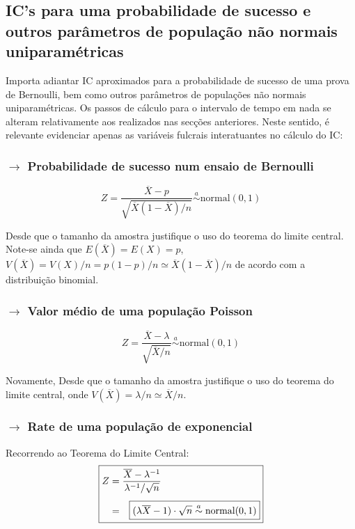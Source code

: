 \newpage
\subsection[5.4 IC's para uma probabilidade de sucesso e outros parâmetros de população não normais uniparamétricas]{\hspace*{0.075 em}\raisebox{0.2 em}{$\pmb{\drsh}$} IC's para uma probabilidade de sucesso e outros parâmetros de população não normais uniparamétricas}

\noindent Importa adiantar IC aproximados para a probabilidade de sucesso de uma prova de Bernoulli, bem como outros parâmetros de populações não normais uniparamétricas. Os passos de cálculo para o intervalo de tempo em nada se alteram relativamente aos realizados nas secções anteriores. Neste sentido, é relevante evidenciar apenas as variáveis fulcrais interatuantes no cálculo do IC:

\subsubsection[5.4.1 Probabilidade de sucesso num ensaio de Bernoulli]{$\pmb{\rightarrow}$ Probabilidade de sucesso num ensaio de Bernoulli}

$$
    \boxed{Z = \dfrac{\overline{X} - p}{\sqrt{\overline{X}(1-\overline{X})/n}} \overset{a}{\sim} \text{normal}(0,1)}
$$

\noindent Desde que o tamanho da amostra justifique o uso do teorema do limite central. Note-se ainda que $E(\overline{X}) = E(X) = p$, $V(\overline{X}) = V(X)/n = p(1 - p)/n \simeq \overline{X}(1-\overline{X})/n$ de acordo com a distribuição binomial.

\subsubsection[5.4.2 Valor médio de uma população Poisson]{$\pmb{\rightarrow}$ Valor médio de uma população Poisson}

$$
    \boxed{Z = \dfrac{\overline{X} - \lambda}{\sqrt{\overline{X}/n}} \overset{a}{\sim} \text{normal}(0,1)}
$$

\noindent Novamente, Desde que o tamanho da amostra justifique o uso do teorema do limite central, onde $V(\overline{X}) = \lambda/n \simeq \overline{X}/n$.

\subsubsection[5.4.3 Rate de uma população exponencial]{$\pmb{\rightarrow}$ Rate de uma população de exponencial}

\noindent Recorrendo ao Teorema do Limite Central:
$$
    \boxed{%
    \begin{aligned}
        Z &= \dfrac{\overline{X} - \lambda^{-1}}{\lambda^{-1}/\sqrt{n}}\\[4pt]
        &= \Aboxed{(\lambda \overline{X} - 1)\cdot \sqrt{n} \overset{a}{\sim} \text{normal}(0,1)}
    \end{aligned}
    }
$$

